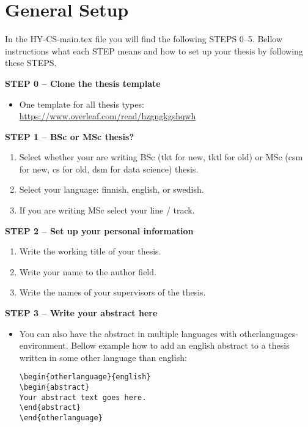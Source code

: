 

\section{General Setup}

In the HY-CS-main.tex file you will find the following STEPS 0--5. Bellow instructions what each STEP means and how to set up your thesis by following these STEPS.
\vspace{0.5cm}

\textbf{STEP 0 -- Clone the thesis template}

\begin{itemize}
\item One template for all thesis types: \url{https://www.overleaf.com/read/hzgngkgshqwh}
\end{itemize}


{\textbf{STEP 1 -- BSc or MSc thesis?}}
\begin{enumerate}
\item Select whether your are writing BSc (tkt for new, tktl for old) or MSc (csm for new, cs for old, dsm for data science) thesis.
\item Select your language: finnish, english, or swedish.
\item If you are writing MSc select your line / track.
\end{enumerate}


{\textbf{STEP 2 -- Set up your personal information}}

\begin{enumerate}
\item Write the working title of your thesis.
\item Write your name to the author field.
\item Write the names of your supervisors of the thesis.
\end{enumerate}

{\textbf{STEP 3 -- Write your abstract here}}

\begin{itemize}
\item You can also have the abstract in multiple languages with otherlanguages-environment. Bellow example how to add an english abstract to a thesis written in some other language than english: 

\begin{verbatim}
\begin{otherlanguage}{english} 
\begin{abstract}
Your abstract text goes here. 
\end{abstract} 
\end{otherlanguage}
\end{verbatim}

\end{itemize}

